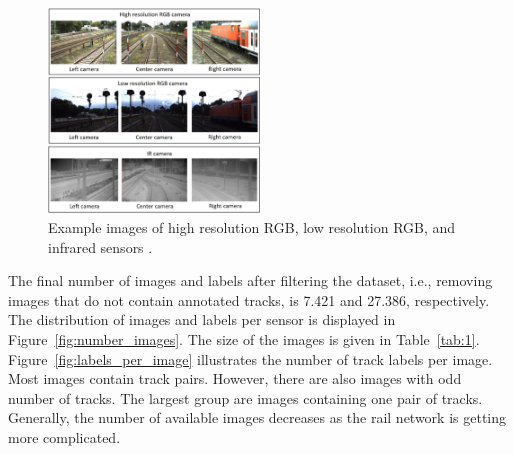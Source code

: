 \documentclass[Master,MDS,english]{BASE/twbook} %
\begin{document}
\begin{figure}[h]
\centering
\includegraphics[width=0.5\textwidth]{images/datasets/db/2024-01-29 19_50_46-2305.03001}
\caption{Example images of high resolution RGB, low resolution RGB, and infrared sensors \citep{tagiew2023osdar23}. }
\label{fig:sensor_image}
\end{figure}


The final number of images and labels after filtering the dataset, i.e., removing images that do not contain annotated tracks, is 7.421 and 27.386, respectively. The distribution of images and labels per sensor is displayed in Figure~\ref{fig:number_images}. The size of the images is given in Table~\ref{tab:1}. Figure~\ref{fig:labels_per_image} illustrates the number of track labels per image. Most images contain track pairs. However, there are also images with odd number of tracks. The largest group are images containing one pair of tracks. Generally, the number of available images decreases as the rail network is getting more complicated.
\end{document}
